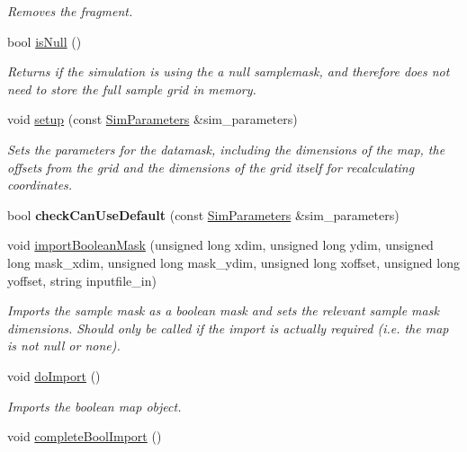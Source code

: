 \begin{DoxyCompactItemize}
\begin{DoxyCompactList}\small\item\em Removes the fragment. \end{DoxyCompactList}\item 
bool \hyperlink{class_data_mask_a9aa4ee43e6c20f4b7c3e8404ee12345b}{is\+Null} ()
\begin{DoxyCompactList}\small\item\em Returns if the simulation is using the a null samplemask, and therefore does not need to store the full sample grid in memory. \end{DoxyCompactList}\item 
void \hyperlink{class_data_mask_ab6a4e6f63856f96805ddc79022c47104}{setup} (const \hyperlink{struct_sim_parameters}{Sim\+Parameters} \&sim\+\_\+parameters)
\begin{DoxyCompactList}\small\item\em Sets the parameters for the datamask, including the dimensions of the map, the offsets from the grid and the dimensions of the grid itself for recalculating coordinates. \end{DoxyCompactList}\item 
bool {\bfseries check\+Can\+Use\+Default} (const \hyperlink{struct_sim_parameters}{Sim\+Parameters} \&sim\+\_\+parameters)\hypertarget{class_data_mask_ae5bf5df7975431338e3ea757e6f2fac9}{}\label{class_data_mask_ae5bf5df7975431338e3ea757e6f2fac9}

\item 
void \hyperlink{class_data_mask_aac63b47c3688db359760f6134d30f239}{import\+Boolean\+Mask} (unsigned long xdim, unsigned long ydim, unsigned long mask\+\_\+xdim, unsigned long mask\+\_\+ydim, unsigned long xoffset, unsigned long yoffset, string inputfile\+\_\+in)
\begin{DoxyCompactList}\small\item\em Imports the sample mask as a boolean mask and sets the relevant sample mask dimensions. Should only be called if the import is actually required (i.\+e. the map is not null or none). \end{DoxyCompactList}\item 
void \hyperlink{class_data_mask_a85f7b85bb4ac54aa884a8a06f1d35d1b}{do\+Import} ()\hypertarget{class_data_mask_a85f7b85bb4ac54aa884a8a06f1d35d1b}{}\label{class_data_mask_a85f7b85bb4ac54aa884a8a06f1d35d1b}

\begin{DoxyCompactList}\small\item\em Imports the boolean map object. \end{DoxyCompactList}\item 
void \hyperlink{class_data_mask_a09a24a15ad49851e8f344150a9109dd2}{complete\+Bool\+Import} ()\hypertarget{class_data_mask_a09a24a15ad49851e8f344150a9109dd2}{}\label{class_data_mask_a09a24a15ad49851e8f344150a9109dd2}


\end{DoxyCompactItemize}
